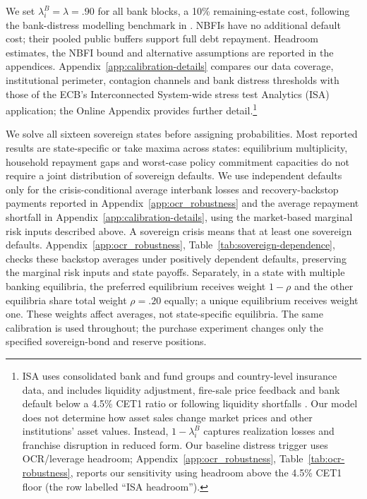 We set $\lambda_i^B=\lambda=.90$ for all bank blocks, a 10\% remaining-estate cost, following the bank-distress modelling benchmark in \citet{Aikman2009}. NBFIs have no additional default cost; their pooled public buffers support full debt repayment. Headroom estimates, the NBFI bound and alternative assumptions are reported in the appendices. Appendix~\ref{app:calibration-details} compares our data coverage, institutional perimeter, contagion channels and bank distress thresholds with those of the ECB's Interconnected System-wide stress test Analytics (ISA) application; the Online Appendix provides further detail.\footnote{ISA uses consolidated bank and fund groups and country-level insurance data, and includes liquidity adjustment, fire-sale price feedback and bank default below a 4.5\% CET1 ratio or following liquidity shortfalls \citep{GrassiEtAl2025}. Our model does not determine how asset sales change market prices and other institutions' asset values. Instead, $1-\lambda_i^B$ captures realization losses and franchise disruption in reduced form. Our baseline distress trigger uses OCR/leverage headroom; Appendix~\ref{app:ocr_robustness}, Table~\ref{tab:ocr-robustness}, reports our sensitivity using headroom above the 4.5\% CET1 floor (the row labelled ``ISA headroom'').}

We solve all sixteen sovereign states before assigning probabilities. Most reported results are state-specific or take maxima across states: equilibrium multiplicity, household repayment gaps and worst-case policy commitment capacities do not require a joint distribution of sovereign defaults. We use independent defaults only for the crisis-conditional average interbank losses and recovery-backstop payments reported in Appendix~\ref{app:ocr_robustness} and the average repayment shortfall in Appendix~\ref{app:calibration-details}, using the market-based marginal risk inputs described above. A sovereign crisis means that at least one sovereign defaults. Appendix~\ref{app:ocr_robustness}, Table~\ref{tab:sovereign-dependence}, checks these backstop averages under positively dependent defaults, preserving the marginal risk inputs and state payoffs. Separately, in a state with multiple banking equilibria, the preferred equilibrium receives weight $1-\rho$ and the other equilibria share total weight $\rho=.20$ equally; a unique equilibrium receives weight one. These weights affect averages, not state-specific equilibria. The same calibration is used throughout; the purchase experiment changes only the specified sovereign-bond and reserve positions.
